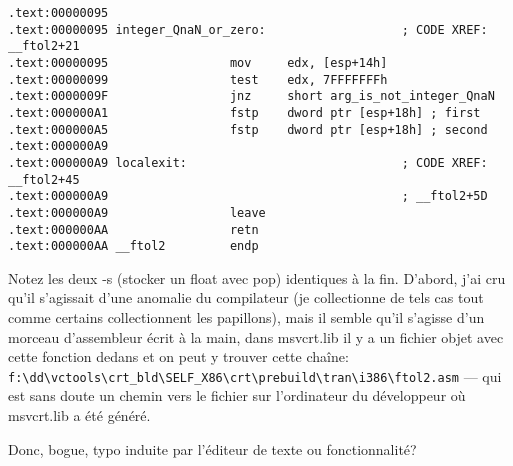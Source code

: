 \begin{lstlisting}
.text:00000095
.text:00000095 integer_QnaN_or_zero:                   ; CODE XREF: __ftol2+21
.text:00000095                 mov     edx, [esp+14h]
.text:00000099                 test    edx, 7FFFFFFFh
.text:0000009F                 jnz     short arg_is_not_integer_QnaN
.text:000000A1                 fstp    dword ptr [esp+18h] ; first
.text:000000A5                 fstp    dword ptr [esp+18h] ; second
.text:000000A9
.text:000000A9 localexit:                              ; CODE XREF: __ftol2+45
.text:000000A9                                         ; __ftol2+5D
.text:000000A9                 leave
.text:000000AA                 retn
.text:000000AA __ftol2         endp
\end{lstlisting}

Notez les deux  -s (stocker un float avec pop) identiques à la fin.
D'abord, j'ai cru qu'il s'agissait d'une anomalie du compilateur (je collectionne
de tels cas tout comme certains collectionnent les papillons), mais il semble qu'il
s'agisse d'un morceau d'assembleur écrit à la main, dans msvcrt.lib il y a un fichier
objet avec cette fonction dedans et on peut y trouver cette chaîne:\\
\verb|f:\dd\vctools\crt_bld\SELF_X86\crt\prebuild\tran\i386\ftol2.asm| ---
qui est sans doute un chemin vers le fichier sur l'ordinateur du développeur où
msvcrt.lib a été généré.

Donc, bogue, typo induite par l'éditeur de texte ou fonctionnalité?

